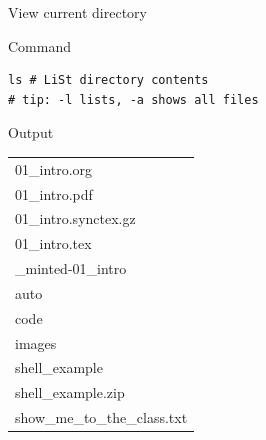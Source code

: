 \documentclass[presentation]{beamer}
\begin{document}
\begin{frame}[label={sec:orgad7946a},fragile]{View current directory}
 \begin{block}{Command}
\begin{verbatim}
ls # LiSt directory contents
# tip: -l lists, -a shows all files
\end{verbatim}
\end{block}

\alert{Output}
\begin{center}
\begin{tabular}{l}
\toprule
01\_intro.org\\
01\_intro.pdf\\
01\_intro.synctex.gz\\
01\_intro.tex\\
\_minted-01\_intro\\
auto\\
code\\
images\\
shell\_example\\
shell\_example.zip\\
show\_me\_to\_the\_class.txt\\
\bottomrule
\end{tabular}
\end{center}
\end{frame}
\end{document}
